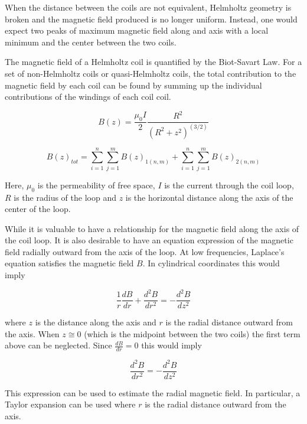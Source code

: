 \documentclass[%
 reprint,
 amsmath,
 amssymb,
 aps,
]{revtex4-1}
\begin{document}
	When the distance between the coils are not equivalent, Helmholtz geometry is broken and the magnetic field produced is no longer uniform. Instead, one would expect two peaks of maximum magnetic field along and axis with a local minimum and the center between the two coils. 
	
	The magnetic field of a Helmholtz coil is quantified by the Biot-Savart Law. For a set of non-Helmholtz coils or quasi-Helmholtz coils, the total contribution to the magnetic field by each coil can be found by summing up the individual contributions of the windings of each coil coil.
	
	\begin{equation}
	B(z) = \frac{\mu_0I}{2}\frac{R^2} {(R^2+z^2)^{(3/2)}}
	\end{equation}
	
	\begin{equation}
	B(z)_{tot} = \sum\limits_{i=1}^n\sum\limits_{j=1}^m B(z)_{1(n,m)} + \sum\limits_{i=1}^n\sum\limits_{j=1}^mB(z)_{2(n,m)}
	\end{equation}

Here, $\mu_0$ is the permeability of free space, $I$ is the current through the coil loop, $R$ is the radius of the loop and $z$ is the horizontal distance along the axis of the center of the loop.


	While it is valuable to have a relationship for the magnetic field along the axis of the coil loop. It is also desirable to have an equation expression of the magnetic field radially outward from the axis of the loop. At low frequencies, Laplace's equation satisfies the magnetic field $B$. In cylindrical coordinates this would imply 

	\begin{equation}
	\frac{1}{r} 
	\frac{dB}{dr} + 
	\frac{d^2B}{dr^2} = 
	-\frac{d^2B}{dz^2}
	\end{equation}

where $z$ is the distance along the axis and $r$ is the radial distance outward from the axis. When $z\cong0$ (which is the midpoint between the two coils) the first term above can be neglected. Since $\frac{dB}{dr}=0$ this would imply

	\begin{equation}
	\frac{d^2B}{dr^2} = 
	-\frac{d^2B}{dz^2}
	\end{equation}
	
This expression can be used to estimate the radial magnetic field. In particular, a Taylor expansion can be used where $r$ is the radial distance outward from the axis.
\end{document}
